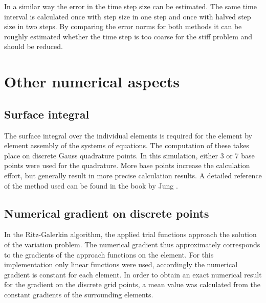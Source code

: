 \documentclass[parskip=half, titlepage=yes, 12pt, BCOR=12mm, DIV=calc]{scrartcl}
\begin{document}
In a similar way the error in the time step size can be estimated. The same time interval is calculated once with step size in one step and once with halved step size in two steps. By comparing the error norms for both methods it can be roughly estimated whether the time step is too coarse for the stiff problem and should be reduced.


\newpage


\section{Other numerical aspects }


\subsection{Surface integral}
The surface integral over the individual elements is required for the element by element assembly of the systems of equations. The computation of these takes place on discrete Gauss quadrature points. In this simulation, either 3 or 7 base points were used for the quadrature. More base points increase the calculation effort, but generally result in more precise calculation results. A detailed reference of the method used can be found in the book by Jung \cite{jung}.

\subsection{Numerical gradient on discrete points}
In the Ritz-Galerkin algorithm, the applied trial functions approach the solution of the variation problem. The numerical gradient thus approximately corresponds to the gradients of the approach functions on the element. For this implementation only linear functions were used, accordingly the numerical gradient is constant for each element. In order to obtain an exact numerical result for the gradient on the discrete grid points, a mean value was calculated from the constant gradients of the surrounding elements.
\end{document}
